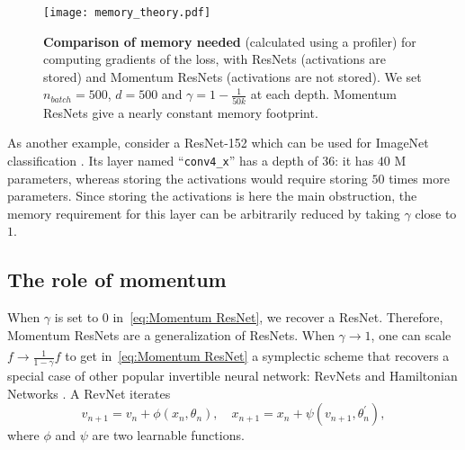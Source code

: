 \documentclass{article}
\begin{document}
\begin{figure}[H]
\centering
\texttt{[image: memory\_theory.pdf]} 
\caption{{\bf Comparison of memory needed} (calculated using a profiler) for computing gradients of the loss, with ResNets (activations are stored) and Momentum ResNets (activations are not stored). We set $n_{batch} = 500$, $d=500$ and $\gamma = 1 - \frac{1}{50k}$ at each depth. Momentum ResNets give a nearly constant memory footprint.
}\label{fig:memo_theory}
\vspace{-1em}
\end{figure}

As another example, consider a ResNet-152 \citep{he2015deep} which can be used for ImageNet classification \citep{deng2009imagenet}. Its layer named ``\texttt{conv4\_x}'' has a depth of $36$: it has $40$ M parameters, whereas storing the activations would require storing $50$ times more parameters. Since storing the activations is here the main obstruction, the memory requirement for this layer can be arbitrarily reduced by taking $\gamma$ close to $1$.




\subsection{The role of momentum}\label{sec:role_momentum}

When $\gamma$ is set to $0$ in~\eqref{eq:Momentum ResNet}, we recover a ResNet. Therefore, Momentum ResNets are a generalization of ResNets. When $\gamma \xrightarrow[]{} 1$, one can scale $f \to \frac{1}{1 - \gamma} f$ to get in~\eqref{eq:Momentum ResNet}
a symplectic scheme \citep{Hairer:1250576} that recovers a special case of other popular invertible neural network: RevNets \citep{gomez2017reversible} and Hamiltonian Networks \citep{chang2017reversible}. 
A RevNet iterates \begin{equation}
     \label{eq:revnet}
    v_{n+1} = v_n + \phi(x_n, \theta_n), 
          \quad
    x_{n+1} = x_n + \psi(v_{n+1}, \theta_n^{'}),
\end{equation}
where $\phi$ and $\psi$ are two learnable functions.
\end{document}

